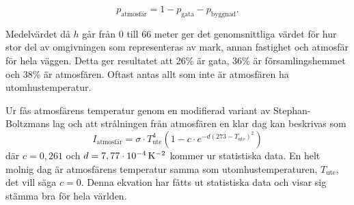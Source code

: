 \begin{equation}
p_\text{atmosfär}=1-p_\text{gata}-p_\text{byggnad}.
\end{equation}

Medelvärdet då $h$ går från 0 till 66 meter ger det genomsnittliga värdet för hur stor del av omgivningen som representeras av mark, annan fastighet och atmosfär för hela väggen. Detta ger resultatet att 26\% är gata, 36\% är 
 församlingshemmet och 38\% är atmosfären. Oftast antas allt som inte är atmosfären ha utomhustemperatur.

Ur \cite{bb_atmosphere} fås atmosfärens temperatur genom en modifierad variant av Stephan-Boltzmans lag och att strålningen från atmosfären en klar dag kan beskrivas som 
\begin{equation}
I_\text{atmosfär}=\sigma\cdot T_\text{ute}^4(1-c \cdot e^{-d(273-T_\text{ute})^2})
\end{equation}
där $c=0,261$ och $d=\unit[7,77\cdot10^{-4}]{K^{-2}}$ kommer ur statistiska data. En helt molnig dag är atmosfärens temperatur samma som utomhustemperaturen, $T_\text{ute}$, det vill säga $c=0$. Denna ekvation har fåtts ut statistiska data och visar sig stämma bra för hela världen\cite{bb_atmosphere}.
